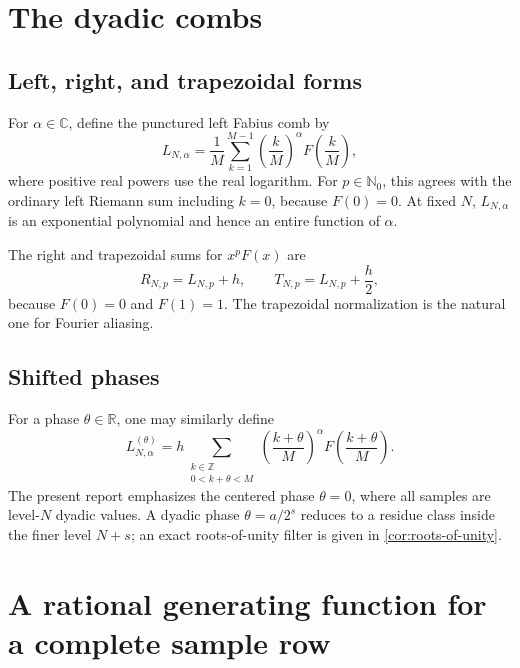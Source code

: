 \documentclass[11pt,oneside]{article}
\numberwithin{equation}{section}
\theoremstyle{definition}
\theoremstyle{remark}
\newcommand{\R}{\mathbb R}
\newcommand{\C}{\mathbb C}
\newcommand{\N}{\mathbb N}
\newcommand{\Z}{\mathbb Z}
\begin{document}
\section{The dyadic combs}
\label{sec:def}

\subsection{Left, right, and trapezoidal forms}

For \(\alpha\in\C\), define the punctured left Fabius comb by
\begin{equation}
 \boxed{\displaystyle
 L_{N,\alpha}
 =\frac1M\sum_{k=1}^{M-1}
 \left(\frac{k}{M}\right)^\alpha F\!\left(\frac{k}{M}\right),}
 \label{eq:L-def}
\end{equation}
where positive real powers use the real logarithm.  For \(p\in\N_0\), this agrees with
the ordinary left Riemann sum including \(k=0\), because \(F(0)=0\).  At fixed
\(N\), \(L_{N,\alpha}\) is an exponential polynomial and hence an entire function of
\(\alpha\).

The right and trapezoidal sums for \(x^pF(x)\) are
\begin{equation}
 R_{N,p}=L_{N,p}+h,
 \qquad
 T_{N,p}=L_{N,p}+\frac h2,
 \label{eq:right-trap}
\end{equation}
because \(F(0)=0\) and \(F(1)=1\).  The trapezoidal normalization is the natural one
for Fourier aliasing.

\subsection{Shifted phases}

For a phase \(\theta\in\R\), one may similarly define
\begin{equation}
 L_{N,\alpha}^{(\theta)}
 =h\sum_{\substack{k\in\Z\\0<k+\theta<M}}
 \left(\frac{k+\theta}{M}\right)^\alpha
 F\!\left(\frac{k+\theta}{M}\right).
 \label{eq:shifted-comb}
\end{equation}
The present report emphasizes the centered phase \(\theta=0\), where all samples are
level-\(N\) dyadic values.  A dyadic phase \(\theta=a/2^s\) reduces to a residue class
inside the finer level \(N+s\); an exact roots-of-unity filter is given in
\cref{cor:roots-of-unity}.

\section{A rational generating function for a complete sample row}
\label{sec:row}
\end{document}
